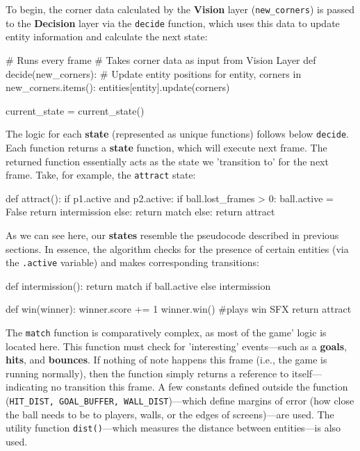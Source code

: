\documentclass{report}
\newcommand{\state}[1]{\textbf{#1}}
\newcommand{\vision}{\textbf{Vision}\xspace}
\newcommand{\decision}{\textbf{Decision}\xspace}
\begin{document}
To begin, the corner data calculated by the \vision layer (\texttt{new\_corners}) is passed to the \decision layer via the \texttt{decide} function, which uses this data to update entity information and calculate the next state:

\begin{codeblock}
# Runs every frame
# Takes corner data as input from Vision Layer
def decide(new_corners):
    # Update entity positions
    for entity, corners in new_corners.items():
        entities[entity].update(corners)

    current_state = current_state()
\end{codeblock}

The logic for each \state{state} (represented as unique functions) follows below \texttt{decide}. Each function returns a \state{state} function, which will execute next frame. The returned function essentially acts as the state we 'transition to' for the next frame. Take, for example, the \texttt{attract} state:

\begin{codeblock}
def attract():
    if p1.active and p2.active:
        if ball.lost_frames > 0:
            ball.active = False
            return intermission
        else:
            return match
    else:
        return attract
\end{codeblock}

As we can see here, our \state{states} resemble the pseudocode described in previous sections. In essence, the algorithm checks for the presence of certain entities (via the \texttt{.active} variable) and makes corresponding transitions:

\begin{codeblock}
def intermission():
    return match if ball.active else intermission
\end{codeblock}

\begin{codeblock}
def win(winner):
    winner.score += 1
    winner.win() #plays win SFX
    return attract
\end{codeblock}

The \texttt{match} function is comparatively complex, as most of the game' logic is located here. This function must check for 'interesting' events---such as a \state{goals}, \state{hits}, and \state{bounces}. If nothing of note happens this frame (i.e., the game is running normally), then the function simply returns a reference to itself---indicating no transition this frame. A few constants defined outside the function (\texttt{HIT\_DIST, GOAL\_BUFFER, WALL\_DIST})---which define margins of error (how close the ball needs to be to players, walls, or the edges of screens)---are used. The utility function \texttt{dist()}---which measures the distance between entities---is also used. 
\end{document}
